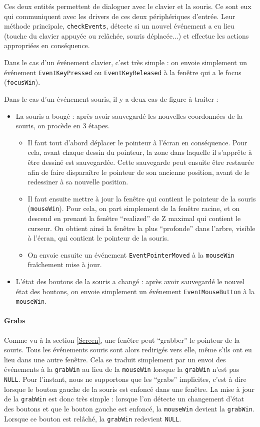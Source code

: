 Ces deux entités permettent de dialoguer avec le clavier et la souris. Ce sont eux qui communiquent avec les drivers de ces deux périphériques d'entrée. Leur méthode principale, \verb|checkEvents|, détecte si un nouvel événement a eu lieu (touche du clavier appuyée ou relâchée, souris déplacée...) et effectue les actions appropriées en conséquence.

Dans le cas d'un événement clavier, c'est très simple : on envoie simplement un événement \verb|EventKeyPressed| ou \verb|EventKeyReleased| à la fenêtre qui a le focus (\verb|focusWin|).

Dans le cas d'un événement souris, il y a deux cas de figure à traiter :
\begin{itemize}
  \item La souris a bougé : après avoir sauvegardé les nouvelles coordonnées de la souris, on procède en 3 étapes.
    \begin{itemize}
      \item Il faut tout d'abord déplacer le pointeur à l'écran en conséquence. Pour cela, avant chaque dessin du pointeur, la zone dans laquelle il s'apprête à être dessiné est sauvegardée. Cette sauvegarde peut ensuite être restaurée afin de faire disparaître le pointeur de son ancienne position, avant de le redessiner à sa nouvelle position.
      \item Il faut ensuite mettre à jour la fenêtre qui contient le pointeur de la souris (\verb|mouseWin|). Pour cela, on part simplement de la fenêtre racine, et on descend en prenant la fenêtre ``realized'' de Z maximal qui contient le curseur. On obtient ainsi la fenêtre la plus ``profonde'' dans l'arbre, visible à l'écran, qui contient le pointeur de la souris.
      \item On envoie ensuite un événement \verb|EventPointerMoved| à la \verb|mouseWin| fraîchement mise à jour.
    \end{itemize}
  \item L'état des boutons de la souris a changé : après avoir sauvegardé le nouvel état des boutons, on envoie simplement un événement \verb|EventMouseButton| à la \verb|mouseWin|.
\end{itemize}

\paragraph{Grabs} Comme vu à la section \ref{Screen}, une fenêtre peut ``grabber'' le pointeur de la souris. Tous les événements souris sont alors redirigés vers elle, même s'ils ont eu lieu dans une autre fenêtre. Cela se traduit simplement par un envoi des événements à la \verb|grabWin| au lieu de la \verb|mouseWin| lorsque la \verb|grabWin| n'est pas \verb|NULL|. Pour l'instant, nous ne supportons que les ``grabs'' implicites, c'est à dire lorsque le bouton gauche de la souris est enfoncé dans une fenêtre. La mise à jour de la \verb|grabWin| est donc très simple : lorsque l'on détecte un changement d'état des boutons et que le bouton gauche est enfoncé, la \verb|mouseWin| devient la \verb|grabWin|. Lorsque ce bouton est relâché, la \verb|grabWin| redevient \verb|NULL|.

